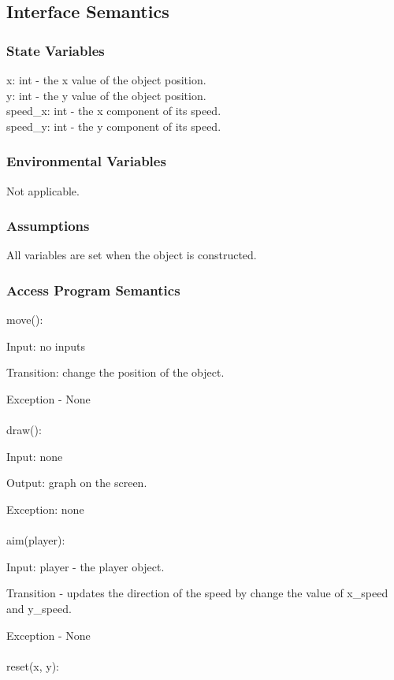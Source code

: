\documentclass[12,english]{article}
\begin{document}
	\subsection{Interface Semantics}
		\subsubsection{State Variables}
		x: int - the x value of the object position.\\
		y: int - the y value of the object position.\\
		speed\_x: int - the x component of its speed.\\
		speed\_y: int - the y component of its speed.\\
		
		\subsubsection{Environmental Variables}
		Not applicable.
		\subsubsection{Assumptions}
			All variables are set when the object is constructed. 

		\subsubsection{Access Program Semantics}

        move():

		Input: no inputs
		
		Transition: change the position of the object.
		
		Exception - None\\
		\\
		draw():
		
		Input: none
			
		Output: graph on the screen.
			 
		Exception: none\\
		\\
		aim(player):
			
		Input: player - the player object.
			 
		Transition - updates the direction of the speed by change the value of x\_speed and y\_speed.
			  			 
		Exception - None\\
		\\
		reset(x, y):
		
\end{document}
